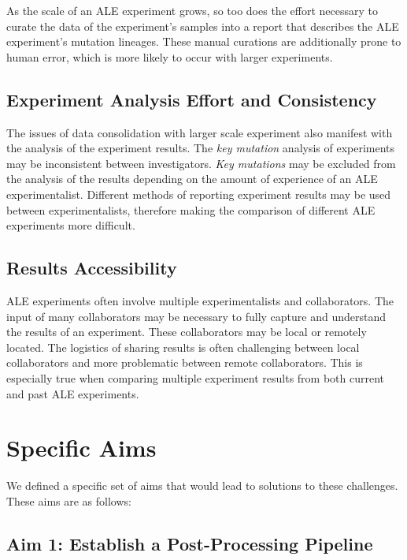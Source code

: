 \documentclass[12pt,final,masters,chapterheads]{ucsd}  %
\begin{document}
As the scale of an ALE experiment grows, so too does the effort necessary to curate the data of the experiment's samples into a report that describes the ALE experiment's mutation lineages. These manual curations are additionally prone to human error, which is more likely to occur with larger experiments.

\subsection{Experiment Analysis Effort and Consistency}

The issues of data consolidation with larger scale experiment also manifest with the analysis of the experiment results. The \textit{key mutation} analysis of experiments may be inconsistent between investigators. \textit{Key mutations} may be excluded from the analysis of the results depending on the amount of experience of an ALE experimentalist. Different methods of reporting experiment results may be used between experimentalists, therefore making the comparison of different ALE experiments more difficult.

\subsection{Results Accessibility}

%
%

ALE experiments often involve multiple experimentalists and collaborators. The input of many collaborators may be necessary to fully capture and understand the results of an experiment. These collaborators may be local or remotely located. The logistics of sharing results is often challenging between local collaborators and more problematic between remote collaborators. This is especially true when comparing multiple experiment results from both current and past ALE experiments.


\section{Specific Aims}

We defined a specific set of aims that would lead to solutions to these challenges. These aims are as follows:

\subsection{Aim 1: Establish a Post-Processing Pipeline}
\end{document}
